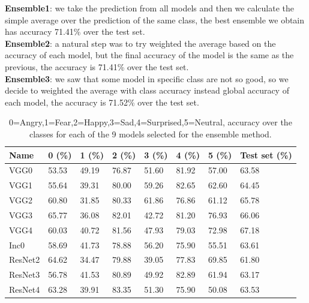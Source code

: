 \documentclass[10pt,twocolumn,letterpaper]{article}
\begin{document}
\newpage
\textbf{Ensemble1}: we take the prediction from all models and then we calculate the simple average over the prediction of the same class, the best ensemble we obtain has accuracy 71.41\% over the test set.\\
\textbf{Ensemble2}: a natural step was to try weighted the average based on the accuracy of each model, but the final accuracy of the model is the same as the previous, the accuracy is 71.41\% over the test set.\\
\textbf{Ensemble3}: we saw that some model in specific class are not so good, so we decide to weighted the average with class accuracy instead global accuracy of each model, the accuracy is 71.52\% over the test set.

\def\arraystretch{1.2}
\begin{table}[H]
   \scriptsize
   \begin{tabular}{L{1.1cm}C{0.5cm}C{0.5cm}C{0.5cm}C{0.5cm}C{0.5cm}C{0.5cm}C{0.8cm}}
      \hline
      Name    & 0 (\%) & 1 (\%) & 2 (\%) & 3 (\%) & 4 (\%) & 5 (\%) & Test set (\%) \\
      \hline\hline
      VGG0    & 53.53  & 49.19  & 76.87  & 51.60  & 81.92  & 57.00  & 63.58         \\
      VGG1    & 55.64  & 39.31  & 80.00  & 59.26  & 82.65  & 62.60  & 64.45         \\
      VGG2    & 60.80  & 31.85  & 80.33  & 61.86  & 76.86  & 61.12  & 65.78         \\
      VGG3    & 65.77  & 36.08  & 82.01  & 42.72  & 81.20  & 76.93  & 66.06         \\
      VGG4    & 60.03  & 40.72  & 81.56  & 47.93  & 79.03  & 72.98  & 67.18         \\
      Inc0    & 58.69  & 41.73  & 78.88  & 56.20  & 75.90  & 55.51  & 63.61         \\
      ResNet2 & 64.62  & 34.47  & 79.88  & 39.05  & 77.83  & 69.85  & 61.80         \\
      ResNet3 & 56.78  & 41.53  & 80.89  & 49.92  & 82.89  & 61.94  & 63.17         \\
      ResNet4 & 63.28  & 39.91  & 83.35  & 51.30  & 75.90  & 50.08  & 63.53         \\
      \hline
   \end{tabular}
   \caption{ 0=Angry,1=Fear,2=Happy,3=Sad,4=Surprised,5=Neutral, accuracy over the classes for each of the 9 models selected for the ensemble method.}
   \label{table:modelli9}
\end{table}
\end{document}
